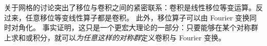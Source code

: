 






关于网格的讨论突出了移位与卷积之间的紧密联系：卷积是线性移位等变运算。反过来，任意移位等变线性算子都是卷积。
%
此外，移位算子可以由 Fourier 变换同时对角化。
%
事实证明，这只是一个更宏大理论的一部分：只要能够在某个对称群上求和或积分，就可以{\em 为任意这样的对称群}定义卷积与 Fourier 变换。



